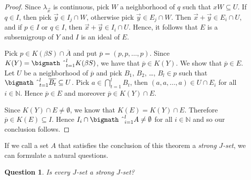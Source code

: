 \documentclass[12pt]{letter}
\theoremstyle{plain}
\newtheorem*{ques}{Question}
\theoremstyle{definition}
\newcommand{\bbN}{\mathbb{N}}
\newcommand{\bigtimes}{\hbox{\bigmath \char'2}}
\begin{document}
\begin{letter}{}
\begin{proof}
  Since $\lambda_{\vec{x}}$ is continuous, pick $W$ a neighborhood of
  $q$ such that $xW \subseteq U$. 
  If $q \in I$, then pick $\vec{y} \in I_j \cap W$, otherwise pick
  $\vec{y} \in E_j \cap W$.
  Then $\vec{x}+\vec{y} \in E_i \cap U$, and if $p \in I$ or $q \in
  I$, then $\vec{x} + \vec{y} \in I_i \cap U$. 
  Hence, it follows that $E$ is a subsemigroup of $Y$ and $I$ is an
  ideal of $E$.

  Pick $p \in K(\beta S) \cap \overline{A}$ and put $\overline{p} =
  (p, p, \ldots, p)$. 
  Since $K(Y) = \bigtimes_{t=1}^l K(\beta S)$, we have that
  $\overline{p} \in K(Y)$. 
  We show that $\overline{p} \in E$.
  Let $U$ be a neighborhood of $\overline{p}$ and pick $B_1$, $B_2$,
  \dots, $B_l \in p$ such that $\bigtimes_{t=1}^l \overline{B_t}
  \subseteq U$. 
  Pick $a \in \bigcap_{t=1}^l B_t$, then $(a, a, \ldots, a) \in U \cap
  E_i$ for all $i \in \bbN$. 
  Hence $\overline{p} \in E$ and moreover $\overline{p} \in K(Y) \cap
  E$.

  Since $K(Y) \cap E \ne \emptyset$, we know that $K(E) = K(Y) \cap
  E$.
  Therefore $\overline{p} \in K(E) \subseteq I$.
  Hence $I_i \cap \bigtimes_{i=1}^l A \ne \emptyset$ for all $i \in
  \bbN$ and so our conclusion follows.
\end{proof}

If we call a set $A$ that satisfies the conclusion of this theorem a
\textsl{strong $J$-set}, we can formulate a natural questions. 

\begin{ques}
  Is every $J$-set a strong $J$-set?
\end{ques}


\end{letter}
\end{document}
